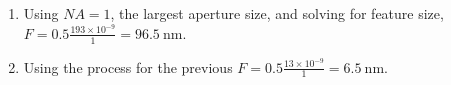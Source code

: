 \documentclass{article}
\begin{document}
\begin{enumerate}[label=\thesubsection]
\begin{enumerate}[label=\alph*)]
				Then, depth of field can be calculated using 
				\[
				  DF = 0.6 \frac{\lambda}{(NA)^2},
				\]
				as \(DF = 0.6 \times 250 \times 10^{-9} = 150 \ \mathrm{nm}\).
			\item Repeating the entire process for \(NA = 0.5\), \(\lambda = \frac{0.25 \times 10^{-6} \times 0.5}{0.5} = 125 \ \mathrm{nm}\) and \(DF = \frac{0.6 \times 125 \times 10^{-9}}{0.25} = 300 \ \mathrm{nm}.\)
		\end{enumerate}
		\setcounter{subsection}{7}
	\item Using \(NA = 1\), the largest aperture size, and solving for feature size, \(F = 0.5 \frac{193 \times 10^{-9}}{1} = 96.5 \ \mathrm{nm}\).
		\setcounter{subsection}{8}
	\item Using the process for the previous \(F = 0.5\frac{13 \times 10^{-9}}{1} = 6.5 \ \mathrm{nm}\).
\end{enumerate}
\end{document}
